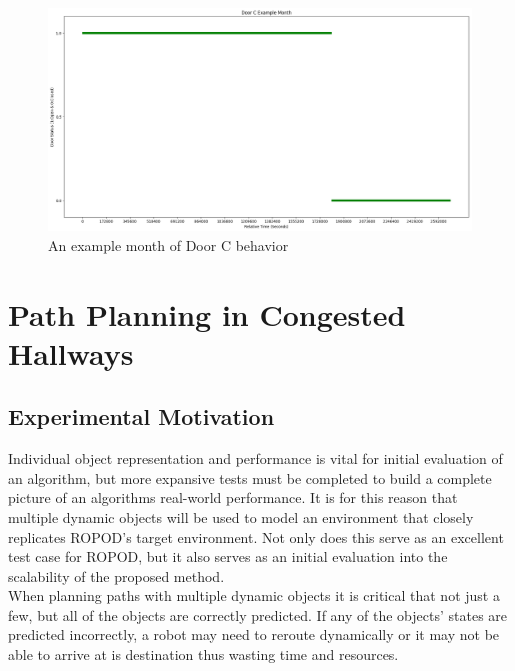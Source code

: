   \begin{figure}[!htb]
    \centering
    \includegraphics[width=\linewidth]{images/Door_C_Example_Month.png}
    \caption{An example month of Door C behavior}
    \label{figure:Door_C_example}
  \end{figure}

  \section{ Path Planning in Congested Hallways}

  \subsection{ Experimental Motivation }

  Individual object representation and performance is vital for initial
  evaluation of an algorithm, but more expansive tests must be completed to
  build a complete picture of an algorithms real-world performance. It is for
  this reason that multiple dynamic objects will be used to model an environment
  that closely replicates ROPOD's target environment. Not only does this
  serve as an excellent test case for ROPOD, but it also serves as an initial
  evaluation into the scalability of the proposed method. \\

  When planning paths with multiple dynamic objects it is critical that not just a
  few, but all of the objects are correctly predicted. If any of the objects' states are
  predicted incorrectly, a robot may need to reroute dynamically or it may not
  be able to arrive at is destination thus wasting time and resources. \\


